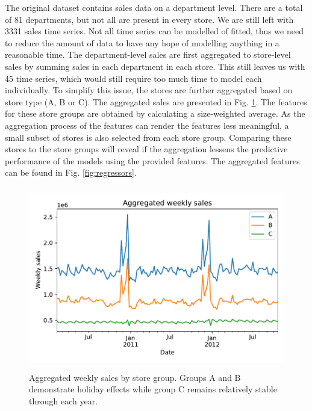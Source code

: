 \documentclass[english, 12pt, a4paper, sci, utf8, a-1b, online]{aaltothesis}
\begin{document}
\begin{abstractpage}[english]

The original dataset contains sales data on a department level. There are a total of 81 departments, but not all are present in every store. We are still left with 3331 sales time series. Not all time series can be modelled of fitted, thus we need to reduce the amount of data to have any hope of modelling anything in a reasonable time. The department-level sales are first aggregated to store-level sales by summing sales in each department in each store. This still leaves us with 45 time series, which would still require too much time to model each individually. To simplify this issue, the stores are further aggregated based on store type (A, B or C). The aggregated sales are presented in Fig. \ref{fig:data_y}. The features for these store groups are obtained by calculating a size-weighted average. As the aggregation process of the features can render the features less meaningful, a small subset of stores is also selected from each store group. Comparing these stores to the store groups will reveal if the aggregation lessens the predictive performance of the models using the provided features. The aggregated features can be found in Fig. \ref{fig:regressors}.

\begin{figure}[htb]
	\centering
	\includegraphics[height=8cm]{../plots/dataset/dataset_plot_y.pdf}
	\caption{Aggregated weekly sales by store group. Groups A and B demonstrate holiday effects while group C remains relatively stable through each year.
	}
	\label{fig:data_y}
\end{figure}


\end{abstractpage}
\end{document}
